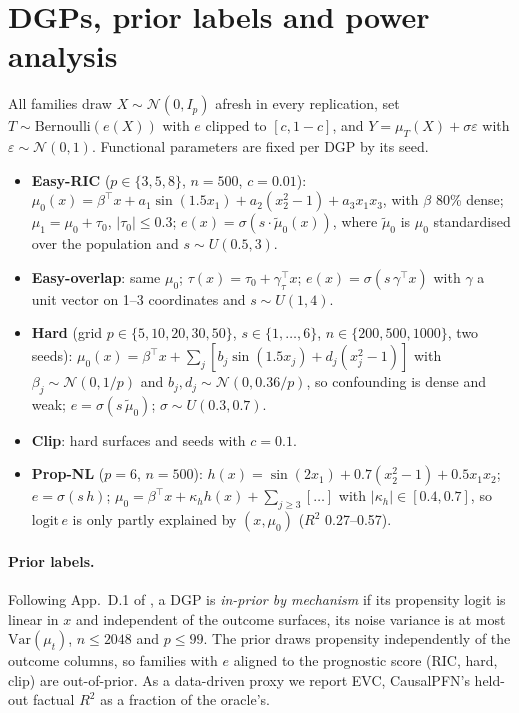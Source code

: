 \documentclass{article}
\begin{document}
\section{DGPs, prior labels and power analysis}\label{app:dgp}
All families draw $X\sim\mathcal N(0, I_p)$ afresh in every replication, set $T\sim\mathrm{Bernoulli}(e(X))$ with $e$ clipped to $[c, 1-c]$, and $Y = \mu_T(X) + \sigma\varepsilon$ with $\varepsilon\sim\mathcal N(0,1)$. Functional parameters are fixed per DGP by its seed.
\begin{itemize}
\item \textbf{Easy-RIC} ($p\in\{3,5,8\}$, $n=500$, $c=0.01$): $\mu_0(x) = \beta^\top x + a_1\sin(1.5x_1) + a_2(x_2^2-1) + a_3x_1x_3$, with $\beta$ 80\% dense; $\mu_1 = \mu_0 + \tau_0$, $|\tau_0|\le 0.3$; $e(x) = \sigma(s\cdot \tilde\mu_0(x))$, where $\tilde\mu_0$ is $\mu_0$ standardised over the population and $s\sim U(0.5,3)$.
\item \textbf{Easy-overlap}: same $\mu_0$; $\tau(x) = \tau_0 + \gamma_\tau^\top x$; $e(x) = \sigma(s\,\gamma^\top x)$ with $\gamma$ a unit vector on 1--3 coordinates and $s\sim U(1,4)$.
\item \textbf{Hard} (grid $p\in\{5,10,20,30,50\}$, $s\in\{1,\dots,6\}$, $n\in\{200,500,1000\}$, two seeds): $\mu_0(x) = \beta^\top x + \sum_j[b_j\sin(1.5x_j) + d_j(x_j^2-1)]$ with $\beta_j\sim\mathcal N(0,1/p)$ and $b_j, d_j\sim\mathcal N(0, 0.36/p)$, so confounding is dense and weak; $e = \sigma(s\,\tilde\mu_0)$; $\sigma\sim U(0.3, 0.7)$.
\item \textbf{Clip}: hard surfaces and seeds with $c=0.1$.
\item \textbf{Prop-NL} ($p=6$, $n=500$): $h(x) = \sin(2x_1) + 0.7(x_2^2-1) + 0.5x_1x_2$; $e=\sigma(s\,h)$; $\mu_0 = \beta^\top x + \kappa_h h(x) + \sum_{j\ge 3}[\dots]$ with $|\kappa_h|\in[0.4,0.7]$, so $\mathrm{logit}\,e$ is only partly explained by $(x,\mu_0)$ ($R^2$ 0.27--0.57).
\end{itemize}
\paragraph{Prior labels.} Following App.~D.1 of \citet{balazadeh2025causalpfn}, a DGP is \emph{in-prior by mechanism} if its propensity logit is linear in $x$ and independent of the outcome surfaces, its noise variance is at most $\mathrm{Var}(\mu_t)$, $n\le 2048$ and $p\le 99$. The prior draws propensity independently of the outcome columns, so families with $e$ aligned to the prognostic score (RIC, hard, clip) are out-of-prior. As a data-driven proxy we report EVC, CausalPFN's held-out factual $R^2$ as a fraction of the oracle's.
\end{document}
